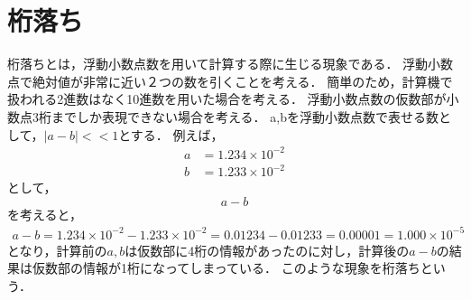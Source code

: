 \section{桁落ち}
桁落ちとは，浮動小数点数を用いて計算する際に生じる現象である．
浮動小数点で絶対値が非常に近い２つの数を引くことを考える．
簡単のため，計算機で扱われる2進数はなく10進数を用いた場合を考える．
浮動小数点数の仮数部が小数点3桁までしか表現できない場合を考える．
a,bを浮動小数点数で表せる数として，$|a - b| << 1$とする．
例えば，
\begin{align}
    a &= 1.234 \times 10^{-2} \\
    b &= 1.233 \times 10^{-2}
\end{align}
として，
\begin{equation}
    a - b
\end{equation}
を考えると，
\begin{align}
    a - b = 1.234 \times 10^{-2} - 1.233 \times 10^{-2} = 0.01234 - 0.01233 = 0.00001 = 1.000 \times 10^{-5}
\end{align}
となり，計算前の$a,b$は仮数部に4桁の情報があったのに対し，計算後の$a-b$の結果は仮数部の情報が1桁になってしまっている．
このような現象を桁落ちという．